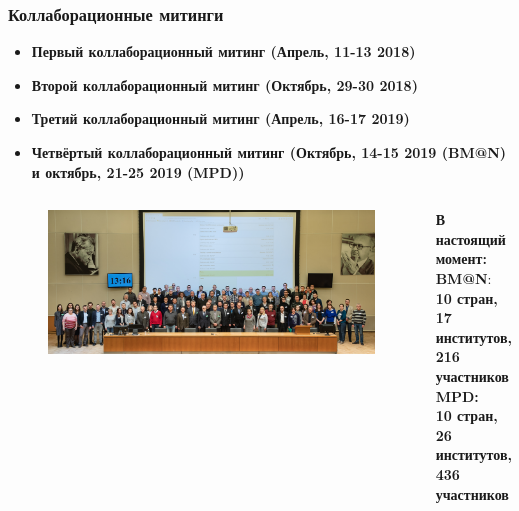 \documentclass[dvipsnames] {beamer}
\begin{document}
\begin{frame}
  \frametitle{\bf \centering \footnotesize Коллаборационные митинги}
  
  \begin{block}{}
    \begin{itemize}
    \item \bf \centering \scriptsize Первый коллаборационный митинг {\color{red} (Апрель, 11-13 2018)}
    \item \bf \centering \scriptsize Второй коллаборационный митинг {\color{red} (Октябрь, 29-30 2018)}
    \item \bf \centering \scriptsize Третий коллаборационный митинг {\color{red} (Апрель, 16-17 2019)}
    \item \bf \centering \scriptsize Четвёртый коллаборационный митинг {\color{red} (Октябрь, 14-15 2019 (BM@N) и октябрь, 21-25 2019 (MPD))}
    \end{itemize}
   \end{block}
  \begin{columns}[c]   
     \begin{block}{}
       \begin{figure}[H]
         \includegraphics[width=1.\linewidth]{third_collab.jpg}
       \end{figure}
     \end{block}
     
     {\footnotesize 
  \begin{block}{\bf \centering \footnotesize В настоящий момент:}
    {\bf \color{red} BM@N}: \\ \bf	10 стран, \\ 17 институтов, \\ 216 участников \\    
    {\bf \color{blue} MPD}: \\ \bf	10 стран, \\ 26 институтов, \\ 436 участников   
  \end{block}
  }
  \end{columns}
 
\end{frame}
\end{document}
